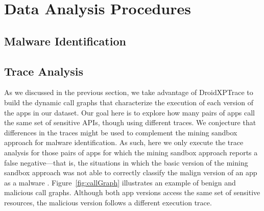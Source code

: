 \section{Data Analysis Procedures}

\subsection{Malware Identification} 


\subsection{Trace Analysis} \label{sec:pathsetup}


As we discussed in the previous section, we take advantage of DroidXPTrace to build the dynamic call graphs
that characterize the execution of each version of the apps in our dataset. Our goal
here is to explore how many pairs of apps call the same set of sensitive APIs, though using different
traces. We conjecture that differences in the traces might be used to complement the mining sandbox
approach for malware identification. As such, here we only execute the trace
analysis for those pairs of apps for which the mining sandbox approach reports a false negative---that is,
the situations in which the basic version of the mining sandbox approach was not able to correctly classify
the malign version of an app as a malware . 
Figure~\ref{fig:callGraph} illustrates an example of benign and malicious call graphs.
Although both app versions access the same set of sensitive resources, the
malicious version follows a different execution trace. 


